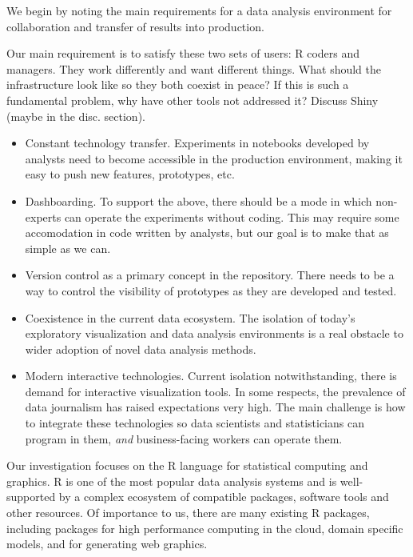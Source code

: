 
We begin by noting the main requirements for a data analysis environment for
collaboration and transfer of results into production.

Our main requirement is to satisfy these two sets of users: R coders and
managers. They work differently and want different things. What should
the infrastructure look like so they both coexist in peace? If this is
such a fundamental problem, why have other tools not addressed it?
Discuss Shiny (maybe in the disc. section).

\begin{itemize}
\item Constant technology transfer. Experiments in notebooks developed
by analysts need to become accessible in the production environment,
making it easy to push new features, prototypes, etc.
\item Dashboarding. To support the above, there should be a mode
in which non-experts can operate the experiments without coding.
This may require some accomodation in code written by analysts,
but our goal is to make that as simple as we can.
\item Version control as a primary concept in the repository. There
needs to be a way to control the visibility of prototypes as they
are developed and tested.
\item Coexistence in the current data ecosystem. The isolation of
today's exploratory visualization and data analysis environments is
a real obstacle to wider adoption of novel data analysis methods.
\item Modern interactive technologies. Current isolation notwithstanding,
there is demand for interactive visualization tools. In some respects,
the prevalence of data journalism has raised expectations very high.
The main challenge is how to integrate these technologies so data
scientists and statisticians can program in them, \emph{and} business-facing
workers can operate them.
\end{itemize}

Our investigation focuses on the R language \cite{RCoreTeam:2013:R}
for statistical computing and graphics. R is one of the most popular
data analysis systems and is well-supported by a complex ecosystem
of compatible packages, software tools and other resources.
%
Of importance to us, there are many existing R packages, including
packages for high performance computing in the cloud, domain specific
models,
and for generating web graphics. %

